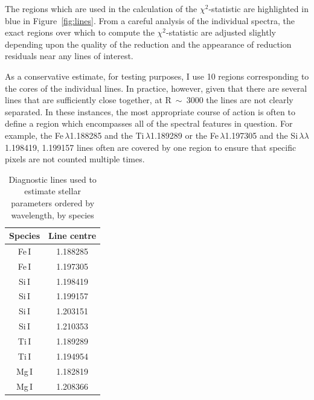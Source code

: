 The regions which are used in the calculation of the $\chi^{2}$-statistic are highlighted in blue in
Figure~\ref{fig:lines}.
From a careful analysis of the individual spectra, the exact regions over which to compute the $\chi^{2}$-statistic are adjusted slightly depending upon the quality of the reduction and the appearance of reduction residuals near any lines of interest.

As a conservative estimate, for testing purposes, I use 10 regions corresponding to the cores of the individual lines.
In practice, however, given that there are several lines that are sufficiently
close together, at R~$\sim$~3000 the lines are not clearly separated.
In these instances, the most appropriate course of action is often to define a region which encompasses all of the spectral features in question.
For example, the Fe\,\1$\lambda$1.188285 and the Ti\,\1$\lambda$1.189289
or the Fe\,\1$\lambda$1.197305 and the Si\,\1$\lambda\lambda$1.198419, 1.199157 lines often are covered by one region to ensure that specific pixels are not counted multiple times.

\begin{table}
\caption[A list of the diagnostic lines used to estimate stellar parameters]{Diagnostic lines used to estimate stellar parameters ordered by wavelength, by species\label{tb:lines}}
\scriptsize
\begin{center}
\begin{tabular}{cc}
 \hline
 \hline
Species & Line centre \\
 \hline
Fe\,I & 1.188285 \\
Fe\,I & 1.197305 \\
Si\,I & 1.198419 \\
Si\,I & 1.199157 \\
Si\,I & 1.203151 \\
Si\,I & 1.210353 \\
Ti\,I & 1.189289 \\
Ti\,I & 1.194954 \\
Mg\,I & 1.182819\\
Mg\,I & 1.208366\\
 \hline
\end{tabular}
\end{center}
\end{table}

